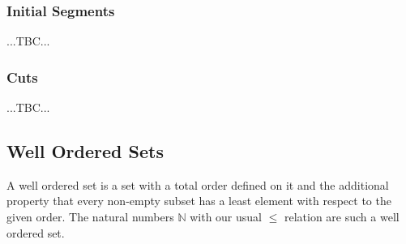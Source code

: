 





\subsubsection{Initial Segments} ...TBC...


\subsubsection{Cuts} ...TBC...


\subsection{Well Ordered Sets} A well ordered set is a set with a total order defined on it and the additional property that every non-empty subset has a least element with respect to the given order. The natural numbers $\mathbb{N}$ with our usual $\leq$ relation are such a well ordered set. 


